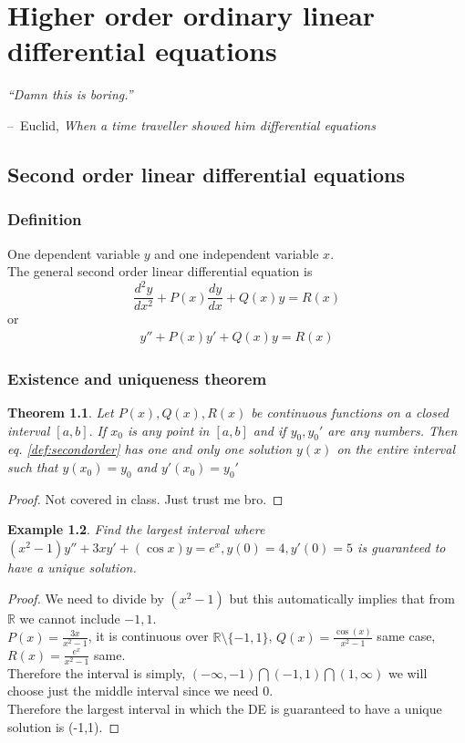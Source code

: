\documentclass[oneside,11pt,pdftex,final]{book}%
\makeatletter
\numberwithin{equation}{section}
\newenvironment{chapquote}[2][2em]
{\setlength{\@tempdima}{#1}%
	\def\chapquote@author{#2}%
	\parshape 1 \@tempdima \dimexpr\textwidth-2\@tempdima\relax%
	\itshape}
{\par\normalfont\hfill--\ \chapquote@author\hspace*{\@tempdima}\par\bigskip}
\newtheorem{theorem}{Theorem}[chapter]%
\newtheorem{example}[theorem]{Example}
\numberwithin{section}{chapter}
\numberwithin{equation}{chapter}
\newcommand{\R}{\mathbb{R}}
\makeatother
\begin{document}
\chapter{Higher order ordinary linear differential equations}
\begin{chapquote}{Euclid, \textit{When a time traveller showed him differential equations}}
	``Damn this is boring.''
\end{chapquote}
\section{Second order linear differential equations}
\subsection{Definition}
One dependent variable $ y $ and one independent variable $ x $.\\
The general second order linear differential equation is \[ \frac{d^2y}{dx^2} + P(x)\frac{dy}{dx}+Q(x)y=R(x)\]
or 
\begin{align} \label{def:secondorder}
	y''+P(x) y'+Q(x)y=R(x)
\end{align}

\subsection{Existence and uniqueness theorem}
\begin{theorem}
Let $ P(x), Q(x), R(x)$ be continuous functions on a closed interval $ [a,b].$ If $ x_0 $ is any point in $ [a,b] $ and if $ y_0, y_0' $ are any numbers. Then eq. \ref{def:secondorder} has one and only one solution $ y(x) $ on the entire interval such that $ y(x_0) =y_0$ and $ y'(x_0) =y_0'$
\end{theorem}
\begin{proof}
	Not covered in class. Just trust me bro.
\end{proof}

\begin{example}
	Find the largest interval where $ (x^2-1)y''+3xy'+(\cos x)y =e^x, y(0)=4, y'(0)=5$ is guaranteed to have a unique solution.
\end{example}

\begin{proof}
	We need to divide by $(x^2-1)$ but this automatically implies that from $ \R $ we cannot include $ -1,1 $. \\
	$ P(x) =\frac{3x}{x^2-1}$, it is continuous over $ \R \setminus \{-1,1\} $,
	$ Q(x)=\frac{\cos(x)}{x^2-1} $ same case,
	$ R(x) =\frac{e^x}{x^2-1}$ same.\\
	Therefore the interval is simply, $ (-\infty,-1)\bigcap (-1,1) \bigcap (1, \infty) $ we will choose just the middle interval since we need $ 0 $.\\
	Therefore the largest interval in which the DE is guaranteed to have a unique solution is (-1,1).
\end{proof}
\end{document}
